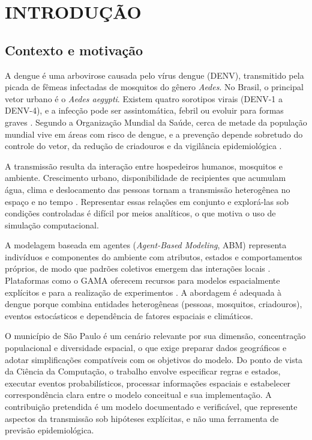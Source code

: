 \chapter{INTRODUÇÃO}
\label{cap:introducao}

\section{Contexto e motivação}

A dengue é uma arbovirose causada pelo vírus dengue (DENV), transmitido pela picada de fêmeas infectadas de mosquitos do gênero \textit{Aedes}. No Brasil, o principal vetor urbano é o \textit{Aedes aegypti}. Existem quatro sorotipos virais (DENV-1 a DENV-4), e a infecção pode ser assintomática, febril ou evoluir para formas graves \cite{brasil_dengue, who_dengue}. Segundo a Organização Mundial da Saúde, cerca de metade da população mundial vive em áreas com risco de dengue, e a prevenção depende sobretudo do controle do vetor, da redução de criadouros e da vigilância epidemiológica \cite{who_dengue}.

A transmissão resulta da interação entre hospedeiros humanos, mosquitos e ambiente. Crescimento urbano, disponibilidade de recipientes que acumulam água, clima e deslocamento das pessoas tornam a transmissão heterogênea no espaço e no tempo \cite{who_dengue}. Representar essas relações em conjunto e explorá-las sob condições controladas é difícil por meios analíticos, o que motiva o uso de simulação computacional.

A modelagem baseada em agentes (\textit{Agent-Based Modeling}, ABM) representa indivíduos e componentes do ambiente com atributos, estados e comportamentos próprios, de modo que padrões coletivos emergem das interações locais \cite{macal_north_2010}. Plataformas como o GAMA oferecem recursos para modelos espacialmente explícitos e para a realização de experimentos \cite{taillandier_etal_2019}. A abordagem é adequada à dengue porque combina entidades heterogêneas (pessoas, mosquitos, criadouros), eventos estocásticos e dependência de fatores espaciais e climáticos.

O município de São Paulo é um cenário relevante por sua dimensão, concentração populacional e diversidade espacial, o que exige preparar dados geográficos e adotar simplificações compatíveis com os objetivos do modelo. Do ponto de vista da Ciência da Computação, o trabalho envolve especificar regras e estados, executar eventos probabilísticos, processar informações espaciais e estabelecer correspondência clara entre o modelo conceitual e sua implementação. A contribuição pretendida é um modelo documentado e verificável, que represente aspectos da transmissão sob hipóteses explícitas, e não uma ferramenta de previsão epidemiológica.

